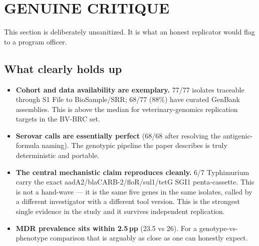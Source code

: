 \documentclass[11pt]{article}
\begin{document}
\section{GENUINE CRITIQUE}

This section is deliberately unsanitized. It is what an honest replicator would flag to a program officer.

\subsection*{What clearly holds up}
\begin{itemize}[leftmargin=*]
  \item \textbf{Cohort and data availability are exemplary.} 77/77 isolates traceable through S1 File to
        BioSample/SRR; 68/77 (88\%) have curated GenBank assemblies. This is above the median for
        veterinary-genomics replication targets in the BV-BRC set.
  \item \textbf{Serovar calls are essentially perfect} (68/68 after resolving the antigenic-formula naming).
        The genotypic pipeline the paper describes is truly deterministic and portable.
  \item \textbf{The central mechanistic claim reproduces cleanly.} 6/7 Typhimurium carry the exact
        aadA2/blaCARB-2/floR/sul1/tetG SGI1 penta-cassette. This is not a hand-wave --- it is the same five
        genes in the same isolates, called by a different investigator with a different tool version.
        This is the strongest single evidence in the study and it survives independent replication.
  \item \textbf{MDR prevalence sits within 2.5\,pp} (23.5 vs 26). For a genotype-vs-phenotype comparison
        that is arguably as close as one can honestly expect.
\end{itemize}
\end{document}
